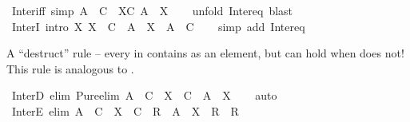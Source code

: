 \begin{isabellebody}
\isamarkupfalse%
%
\endisatagproof
{\isafoldproof}%
%
\isadelimproof
\isanewline
%
\endisadelimproof
\isanewline
{}\isamarkupfalse%
\ Inter{\isacharunderscore}{\kern0pt}iff\ {\isacharbrackleft}{\kern0pt}simp{\isacharbrackright}{\kern0pt}{\isacharcolon}{\kern0pt}\ {\isachardoublequoteopen}A\ {\isasymin}\ {\isasymInter}C\ {\isasymlongleftrightarrow}\ {\isacharparenleft}{\kern0pt}{\isasymforall}X{\isasymin}C{\isachardot}{\kern0pt}\ A\ {\isasymin}\ X{\isacharparenright}{\kern0pt}{\isachardoublequoteclose}\isanewline
%
\isadelimproof
\ \ %
\endisadelimproof
%
\isatagproof
{}\isamarkupfalse%
\ {\isacharparenleft}{\kern0pt}unfold\ Inter{\isacharunderscore}{\kern0pt}eq{\isacharparenright}{\kern0pt}\ blast%
\endisatagproof
{\isafoldproof}%
%
\isadelimproof
\isanewline
%
\endisadelimproof
\isanewline
{}\isamarkupfalse%
\ InterI\ {\isacharbrackleft}{\kern0pt}intro{\isacharbang}{\kern0pt}{\isacharbrackright}{\kern0pt}{\isacharcolon}{\kern0pt}\ {\isachardoublequoteopen}{\isacharparenleft}{\kern0pt}{\isasymAnd}X{\isachardot}{\kern0pt}\ X\ {\isasymin}\ C\ {\isasymLongrightarrow}\ A\ {\isasymin}\ X{\isacharparenright}{\kern0pt}\ {\isasymLongrightarrow}\ A\ {\isasymin}\ {\isasymInter}C{\isachardoublequoteclose}\isanewline
%
\isadelimproof
\ \ %
\endisadelimproof
%
\isatagproof
{}\isamarkupfalse%
\ {\isacharparenleft}{\kern0pt}simp\ add{\isacharcolon}{\kern0pt}\ Inter{\isacharunderscore}{\kern0pt}eq{\isacharparenright}{\kern0pt}%
\endisatagproof
{\isafoldproof}%
%
\isadelimproof
%
\endisadelimproof
%
\begin{isamarkuptext}%
\medskip A ``destruct'' rule -- every  in 
  contains  as an element, but  can hold when
   does not!  This rule is analogous to .%
\end{isamarkuptext}\isamarkuptrue%
\isamarkupfalse%
\ InterD\ {\isacharbrackleft}{\kern0pt}elim{\isacharcomma}{\kern0pt}\ Pure{\isachardot}{\kern0pt}elim{\isacharbrackright}{\kern0pt}{\isacharcolon}{\kern0pt}\ {\isachardoublequoteopen}A\ {\isasymin}\ {\isasymInter}C\ {\isasymLongrightarrow}\ X\ {\isasymin}\ C\ {\isasymLongrightarrow}\ A\ {\isasymin}\ X{\isachardoublequoteclose}\isanewline
%
\isadelimproof
\ \ %
\endisadelimproof
%
\isatagproof
{}\isamarkupfalse%
\ auto%
\endisatagproof
{\isafoldproof}%
%
\isadelimproof
\isanewline
%
\endisadelimproof
\isanewline
{}\isamarkupfalse%
\ InterE\ {\isacharbrackleft}{\kern0pt}elim{\isacharbrackright}{\kern0pt}{\isacharcolon}{\kern0pt}\ {\isachardoublequoteopen}A\ {\isasymin}\ {\isasymInter}C\ {\isasymLongrightarrow}\ {\isacharparenleft}{\kern0pt}X\ {\isasymnotin}\ C\ {\isasymLongrightarrow}\ R{\isacharparenright}{\kern0pt}\ {\isasymLongrightarrow}\ {\isacharparenleft}{\kern0pt}A\ {\isasymin}\ X\ {\isasymLongrightarrow}\ R{\isacharparenright}{\kern0pt}\ {\isasymLongrightarrow}\ R{\isachardoublequoteclose}\isanewline

\end{isabellebody}
